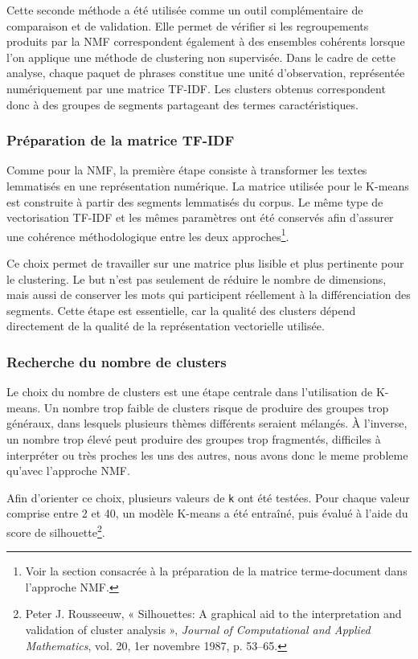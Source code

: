 Cette seconde méthode a été utilisée comme un outil complémentaire de comparaison et de validation. Elle permet de vérifier si les regroupements produits par la NMF correspondent également à des ensembles cohérents lorsque l'on applique une méthode de clustering non supervisée. Dans le cadre de cette analyse, chaque paquet de phrases constitue une unité d'observation, représentée numériquement par une matrice TF-IDF. Les clusters obtenus correspondent donc à des groupes de segments partageant des termes caractéristiques.

\subsubsection{Préparation de la matrice TF-IDF}

Comme pour la NMF, la première étape consiste à transformer les textes lemmatisés en une représentation numérique. La matrice utilisée pour le K-means est construite à partir des segments lemmatisés du corpus. Le même type de vectorisation TF-IDF et les mêmes paramètres ont été conservés afin d'assurer une cohérence méthodologique entre les deux approches\footnote{Voir la section consacrée à la préparation de la matrice terme-document dans l'approche NMF.}.

Ce choix permet de travailler sur une matrice plus lisible et plus pertinente pour le clustering. Le but n'est pas seulement de réduire le nombre de dimensions, mais aussi de conserver les mots qui participent réellement à la différenciation des segments. Cette étape est essentielle, car la qualité des clusters dépend directement de la qualité de la représentation vectorielle utilisée.

\subsubsection{Recherche du nombre de clusters}

Le choix du nombre de clusters est une étape centrale dans l'utilisation de K-means. Un nombre trop faible de clusters risque de produire des groupes trop généraux, dans lesquels plusieurs thèmes différents seraient mélangés. À l'inverse, un nombre trop élevé peut produire des groupes trop fragmentés, difficiles à interpréter ou très proches les uns des autres, nous avons donc le meme probleme qu'avec l'approche NMF.

Afin d'orienter ce choix, plusieurs valeurs de \texttt{k} ont été testées. Pour chaque valeur comprise entre 2 et 40, un modèle K-means a été entraîné, puis évalué à l'aide du score de silhouette\footnote{Peter J. Rousseeuw, « Silhouettes: A graphical aid to the interpretation and validation of cluster analysis », \textit{Journal of Computational and Applied Mathematics}, vol. 20, 1er novembre 1987, p. 53--65.}.

